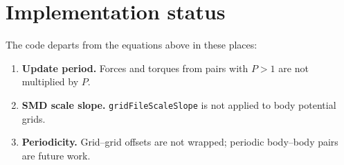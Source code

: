 \documentclass[11pt]{article}
\newcommand{\code}[1]{\texttt{#1}}
\begin{document}
\section{Implementation status}
\label{sec:status}

The code departs from the equations above in these places:
\begin{enumerate}
  \item \textbf{Update period.} Forces and torques from pairs with $P>1$ are
    not multiplied by $P$.
  \item \textbf{SMD scale slope.} \code{gridFileScaleSlope} is not applied to
    body potential grids.
  \item \textbf{Periodicity.} Grid--grid offsets are not wrapped; periodic
    body--body pairs are future work.
\end{enumerate}
\end{document}
